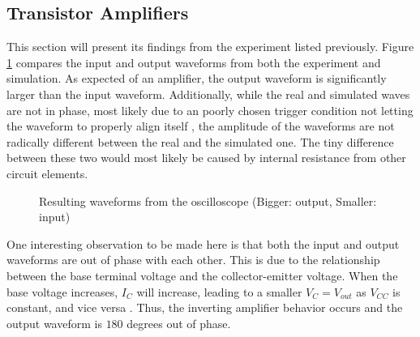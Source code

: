 \documentclass[11pt]{report}
\begin{document}
\subsection{Transistor Amplifiers}
This section will present its findings from the experiment listed previously. Figure \ref{sect3-1} compares the input and output waveforms from both the experiment and simulation. As expected of an amplifier, the output waveform is significantly larger than the input waveform. Additionally, while the real and simulated waves are not in phase, most likely due to an poorly chosen trigger condition not letting the waveform to properly align itself \autocite{strattonAnswerOscilloscopeRun2018}, the amplitude of the waveforms are not radically different between the real and the simulated one. The tiny difference between these two would most likely be caused by internal resistance from other circuit elements.
\begin{figure}[h]
	\centering
	\caption{Resulting waveforms from the oscilloscope (Bigger: output, Smaller: input)}
	\label{sect3-1}
\end{figure}

One interesting observation to be made here is that both the input and output waveforms are out of phase with each other. This is due to the relationship between the base terminal voltage and the collector-emitter voltage. When the base voltage increases, $I_C$ will increase, leading to a smaller $V_C = V_{out}$ as $V_{CC}$ is constant, and vice versa \autocite{storrCommonEmitterAmplifier2013}. Thus, the inverting amplifier behavior occurs and the output waveform is $180$ degrees out of phase.
\end{document}
